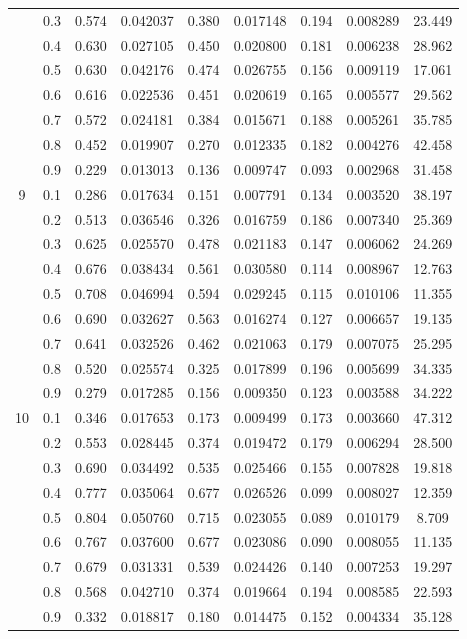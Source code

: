 \begin{longtable}{ | c | c || c | c | c | c | c | c | c | }
 & 0.3 & 0.574 & 0.042037 & 0.380 & 0.017148 & 0.194 & 0.008289 & 23.449 \\
 & 0.4 & 0.630 & 0.027105 & 0.450 & 0.020800 & 0.181 & 0.006238 & 28.962 \\
 & 0.5 & 0.630 & 0.042176 & 0.474 & 0.026755 & 0.156 & 0.009119 & 17.061 \\
 & 0.6 & 0.616 & 0.022536 & 0.451 & 0.020619 & 0.165 & 0.005577 & 29.562 \\
 & 0.7 & 0.572 & 0.024181 & 0.384 & 0.015671 & 0.188 & 0.005261 & 35.785 \\
 & 0.8 & 0.452 & 0.019907 & 0.270 & 0.012335 & 0.182 & 0.004276 & 42.458 \\
 & 0.9 & 0.229 & 0.013013 & 0.136 & 0.009747 & 0.093 & 0.002968 & 31.458 \\
 \hline
\multirow{9}{*}{9} & 0.1 & 0.286 & 0.017634 & 0.151 & 0.007791 & 0.134 & 0.003520 & 38.197 \\
 & 0.2 & 0.513 & 0.036546 & 0.326 & 0.016759 & 0.186 & 0.007340 & 25.369 \\
 & 0.3 & 0.625 & 0.025570 & 0.478 & 0.021183 & 0.147 & 0.006062 & 24.269 \\
 & 0.4 & 0.676 & 0.038434 & 0.561 & 0.030580 & 0.114 & 0.008967 & 12.763 \\
 & 0.5 & 0.708 & 0.046994 & 0.594 & 0.029245 & 0.115 & 0.010106 & 11.355 \\
 & 0.6 & 0.690 & 0.032627 & 0.563 & 0.016274 & 0.127 & 0.006657 & 19.135 \\
 & 0.7 & 0.641 & 0.032526 & 0.462 & 0.021063 & 0.179 & 0.007075 & 25.295 \\
 & 0.8 & 0.520 & 0.025574 & 0.325 & 0.017899 & 0.196 & 0.005699 & 34.335 \\
 & 0.9 & 0.279 & 0.017285 & 0.156 & 0.009350 & 0.123 & 0.003588 & 34.222 \\
 \hline
\multirow{9}{*}{10} & 0.1 & 0.346 & 0.017653 & 0.173 & 0.009499 & 0.173 & 0.003660 & 47.312 \\
 & 0.2 & 0.553 & 0.028445 & 0.374 & 0.019472 & 0.179 & 0.006294 & 28.500 \\
 & 0.3 & 0.690 & 0.034492 & 0.535 & 0.025466 & 0.155 & 0.007828 & 19.818 \\
 & 0.4 & 0.777 & 0.035064 & 0.677 & 0.026526 & 0.099 & 0.008027 & 12.359 \\
 & 0.5 & 0.804 & 0.050760 & 0.715 & 0.023055 & 0.089 & 0.010179 & 8.709 \\
 & 0.6 & 0.767 & 0.037600 & 0.677 & 0.023086 & 0.090 & 0.008055 & 11.135 \\
 & 0.7 & 0.679 & 0.031331 & 0.539 & 0.024426 & 0.140 & 0.007253 & 19.297 \\
 & 0.8 & 0.568 & 0.042710 & 0.374 & 0.019664 & 0.194 & 0.008585 & 22.593 \\
 & 0.9 & 0.332 & 0.018817 & 0.180 & 0.014475 & 0.152 & 0.004334 & 35.128 \\
 \hline
\hline
\end{longtable}
 
